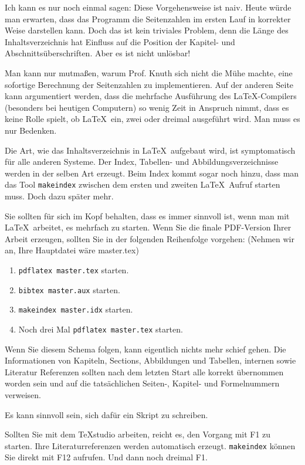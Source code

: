 Ich kann es nur noch einmal sagen: Diese Vorgehensweise ist naiv. Heute würde man erwarten, dass das Programm die Seitenzahlen im ersten Lauf in korrekter Weise darstellen kann. Doch das ist kein triviales Problem, denn die Länge des Inhaltsverzeichnis hat Einfluss auf die Position der Kapitel- und Abschnittsüberschriften. Aber es ist nicht unlösbar! 

Man kann nur mutmaßen, warum Prof. Knuth sich nicht die Mühe machte, eine sofortige Berechnung der Seitenzahlen zu implementieren. Auf der anderen Seite kann argumentiert werden, dass die mehrfache Ausführung des \LaTeX-Compilers (besonders bei heutigen Computern) so wenig Zeit in Anspruch nimmt, dass es keine Rolle spielt, ob \LaTeX\ ein, zwei oder dreimal ausgeführt wird. Man muss es nur Bedenken.

Die Art, wie das Inhaltsverzeichnis in \LaTeX\ aufgebaut wird, ist symptomatisch für alle anderen Systeme. Der Index, Tabellen- und Abbildungsverzeichnisse werden in der selben Art erzeugt. Beim Index kommt sogar noch hinzu, dass man das Tool \texttt{makeindex} zwischen dem ersten und zweiten \LaTeX\ Aufruf starten muss. Doch dazu später mehr. 

Sie sollten für sich im Kopf behalten, dass es immer sinnvoll ist, wenn man mit \LaTeX\ arbeitet, es mehrfach zu starten. Wenn Sie die finale PDF-Version Ihrer Arbeit erzeugen, sollten Sie in der folgenden Reihenfolge vorgehen: (Nehmen wir an, Ihre Hauptdatei wäre master.tex)

\begin{enumerate}
\item \texttt{pdflatex master.tex} starten. 
\item \texttt{bibtex master.aux} starten.
\item \texttt{makeindex master.idx} starten.
\item Noch drei Mal \texttt{pdflatex master.tex} starten. 
\end{enumerate}
Wenn Sie diesem Schema folgen, kann eigentlich nichts mehr schief gehen. Die Informationen von Kapiteln, Sections, Abbildungen und Tabellen, internen sowie Literatur Referenzen sollten nach dem letzten Start alle korrekt übernommen worden sein und auf die tatsächlichen Seiten-, Kapitel- und Formelnummern verweisen.

 Es kann sinnvoll sein, sich dafür ein Skript zu schreiben. 

Sollten Sie mit dem TeXstudio arbeiten, reicht es, den Vorgang mit F1 zu starten. Ihre Literaturreferenzen werden automatisch erzeugt. \texttt{makeindex} können Sie direkt mit F12 aufrufen. Und dann noch dreimal F1. 

